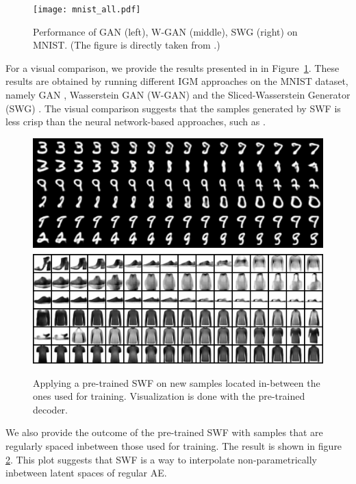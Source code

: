 \begin{figure}[]
\centering
\texttt{[image: mnist\_all.pdf]}
\caption{Performance of GAN (left), W-GAN (middle), SWG (right) on MNIST. (The figure is directly taken from \cite{deshpande2018generative}.) }
\label{fig:mnistall}
\vspace{-10pt}
\end{figure}

For a visual comparison, we provide the results presented in \cite{deshpande2018generative} in Figure~\ref{fig:mnistall}. These results are obtained by running different IGM approaches on the MNIST dataset, namely GAN \cite{goodfellow2014generative}, Wasserstein GAN (W-GAN) \cite{arjovsky2017wasserstein} and the Sliced-Wasserstein Generator (SWG) \cite{deshpande2018generative}.
%
The visual comparison suggests that the samples generated by SWF is less crisp than the neural network-based approaches, such as \cite{goodfellow2014generative,arjovsky2017wasserstein,deshpande2018generative}.

\begin{figure}
\centering
\includegraphics[width=0.95\columnwidth]{figures/interpolations.png}
\label{fig:interpolation}
\caption{Applying a pre-trained SWF on new samples located in-between the ones used for training. Visualization is done with the pre-trained decoder.}
\end{figure}

We also provide the outcome of the pre-trained SWF with samples that are regularly spaced inbetween those used for training. The result is shown in figure \ref{fig:interpolation}. This plot suggests that SWF is a way to interpolate non-parametrically inbetween latent spaces of regular AE.




